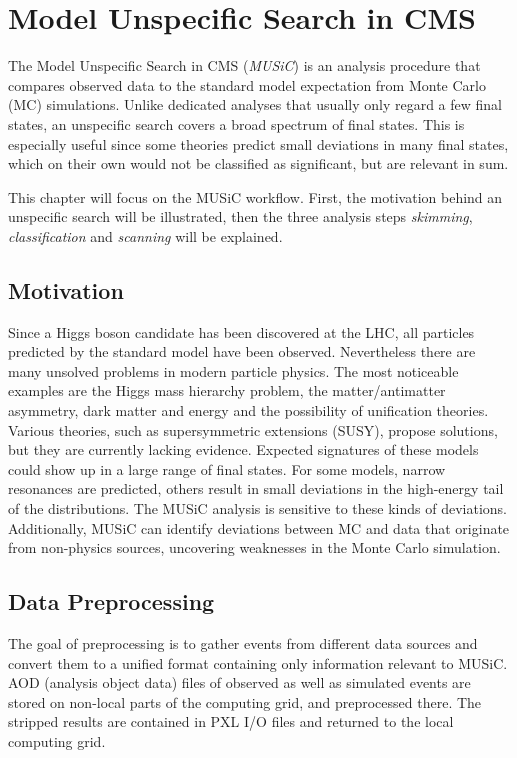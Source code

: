 
\chapter{Model Unspecific Search in CMS}

The Model Unspecific Search in CMS (\emph{MUSiC})\cite{Pieta2012MUSiC,Papacz2014Model,Duchardt2015MUSiC} is an analysis procedure that compares observed data to the standard model expectation from Monte Carlo (MC) simulations. Unlike dedicated analyses that usually only regard a few final states, an unspecific search covers a broad spectrum of final states.
This is especially useful since some theories predict small deviations in many final states, which on their own would not be classified as significant, but are relevant in sum.

This chapter will focus on the MUSiC workflow. First, the motivation behind an unspecific search will be illustrated, then the three analysis steps \emph{skimming}, \emph{classification} and \emph{scanning} will be explained.

\section{Motivation}
Since a Higgs boson candidate has been discovered at the LHC\cite{Ao2015Combined}, all particles predicted by the standard model have been observed.
Nevertheless there are many unsolved problems in modern particle physics. The most noticeable examples are the Higgs mass hierarchy problem, the matter/antimatter asymmetry, dark matter and energy and the possibility of unification theories. Various theories, such as supersymmetric extensions (SUSY), propose solutions, but they are currently lacking evidence.
Expected signatures of these models could show up in a large range of final states. For some models, narrow resonances are predicted, others result in small deviations in the high-energy tail of the distributions.
The MUSiC analysis is sensitive to these kinds of deviations.
Additionally, MUSiC can identify deviations between MC and data that originate from non-physics sources, uncovering weaknesses in the Monte Carlo simulation.

\section{Data Preprocessing}
The goal of preprocessing is to gather events from different data sources and convert them to a unified format containing only information relevant to MUSiC. AOD (analysis object data) files of observed as well as simulated events are stored on non-local parts of the computing grid, and preprocessed there. The stripped results are contained in PXL I/O files\cite{BBE+2012Development} and returned to the local computing grid.

